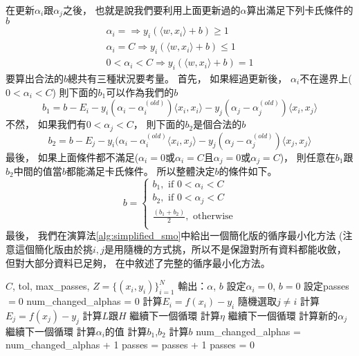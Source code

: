  在更新$\alpha_i$跟$\alpha_j$之後，
  也就是說我們要利用上面更新過的$\alpha$算出滿足下列卡氏條件的$b$
  \begin{align}
    \alpha_i = \Rightarrow y_i (\langle w, x_i \rangle + b) \geq 1 \\
    \alpha_i = C \Rightarrow y_i (\langle w, x_i \rangle + b) \leq 1 \\
    0 < \alpha_i < C \Rightarrow y_i (\langle w, x_i \rangle + b) = 1 
  \end{align}
  要算出合法的$b$總共有三種狀況要考量。
  首先，
  如果經過更新後，
  $\alpha_i$不在邊界上($0 < \alpha_i < C$)
  則下面的$b_1$可以作為我們的$b$
  \begin{equation}
    b_1 = b - E_i - y_i (\alpha_i - \alpha_i^{(old)}) \langle x_i, x_i \rangle - y_j (\alpha_j - \alpha_j^{(old)}) \langle x_i, x_j \rangle
  \end{equation}
  不然，
  如果我們有$0 < \alpha_j < C$，
  則下面的$b_2$是個合法的$b$
  \begin{equation}
    b_2 = b - E_j - y_i (\alpha_i - \alpha_i^{(old)} \langle x_i, x_j \rangle - y_j (\alpha_j - \alpha_j^{(old)}) \langle x_j, x_j \rangle
  \end{equation}
  最後， 
  如果上面條件都不滿足($\alpha_i = 0$或$\alpha_i = C$且$\alpha_j = 0$或$\alpha_j = C$)，
  則任意在$b_1$跟$b_2$中間的值當$b$都能滿足卡氏條件。
  所以整體決定$b$的條件如下。
  \begin{equation}
    b = 
    \left\{
      \begin{array}{l}
	b_1, \text{ if } 0 < \alpha_i < C \\
	b_2, \text{ if } 0 < \alpha_j < C \\
	\frac{(b_1 + b_2)}{2}, \text{ otherwise} \\
      \end{array}
    \right.
  \end{equation}
  最後，
  我們在演算法\ref{alg:simplified_smo}中給出一個簡化版的循序最小化方法
  (注意這個簡化版由於挑$i, j$是用隨機的方式挑，所以不是保證對所有資料都能收斂，但對大部分資料已足夠，
  在\cite{Microsoft98SMO}中敘述了完整的循序最小化方法。
  \begin{algorithmic}[1]
    \label{alg:simplified_smo}
    \REQUIRE $C$, tol, max\_passes, $Z = \lbrace (x_i, y_i) \rbrace_{i=1}^N$
    \ENSURE 輸出：$\alpha$, $b$
    \STATE 設定$\alpha_i = 0$, $b = 0$
    \STATE 設定passes $= 0$
      \STATE num\_changed\_alphas = 0
	\STATE 計算$E_i = f(x_i) - y_i$
	  \STATE 隨機選取$j \neq i$
	  \STATE 計算$E_j = f(x_j) - y_j$
	  \STATE 計算$L$跟$H$
	    \STATE 繼續下一個循環
	  \ENDIF
	  \STATE 計算$\eta$
	    \STATE 繼續下一個循環
	  \ENDIF
	  \STATE 計算新的$\alpha_j$
	    \STATE 繼續下一個循環
	  \ENDIF
	  \STATE 計算$\alpha_i$的值
	  \STATE 計算$b_1$,$b_2$
	  \STATE 計算$b$
	  \STATE num\_changed\_alphas = num\_changed\_alphas + 1
	\ENDIF
      \ENDFOR
    \ENDWHILE
      \STATE passes = passes + 1
    \ELSE
      \STATE passes = 0
    \ENDIF
  \end{algorithmic}
